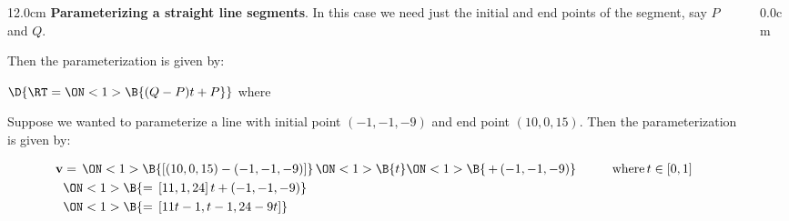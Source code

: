 \begin{frame}
{}
\scriptsize
\begin{columns}
\begin{column}{12.0cm}
{\bf Parameterizing a straight line segments}.  In this case we need just the initial and end points of the segment, say $P$ and $Q$.

\vspace{0.4cm}

Then the parameterization is given by:

\vspace{0.2cm}

\begin{center}
	$\D{\RT = 
	\ON<1>{\B{(Q-P) t + P}}}$ \quad where \quad 
	\ON<1>{\B{$t \in [0,1]$}}
\end{center}

\vspace{0.2cm}

\EX Suppose we wanted to parameterize a line with initial point $(-1,-1,-9)$ and end point $(10,0,15)$.  Then the parameterization is given by: 

\begin{align*}
	{\bf v} 
	&= \, \ON<1>{\B{[(10,0,15)-(-1,-1,-9)]}} \, 
	\ON<1>{\B{t}} 
	\ON<1>{\B{\, + \, (-1,-1,-9)}} \hspace{1.0cm} \text{where} \, t \in [0,1] \\
	&\ON<1>{\B{= \, [11,1,24] \, t + (-1,-1,-9)}} \\
	&\ON<1>{\B{= \, [11t-1,t-1,24-9t]}} \\
\end{align*}

\vspace{2.2cm}

\end{column}
\begin{column}{0.0cm}\end{column}
\end{columns}
\end{frame}



